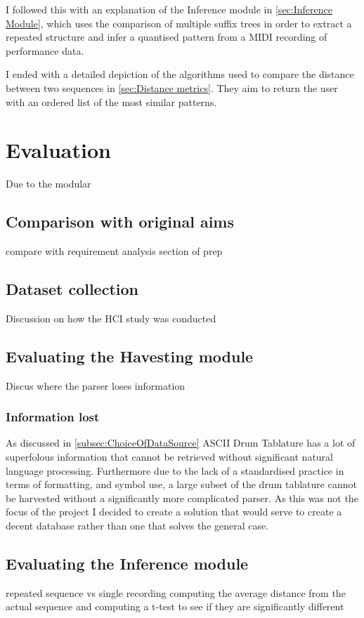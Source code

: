 \documentclass[12pt,twoside,notitlepage]{report}
\begin{document}
	I followed this with an explanation of the Inference module in \ref{sec:Inference Module}, which uses the comparison of multiple suffix trees in order to extract a repeated structure and infer a quantised pattern from a MIDI recording of performance data.
	
	I ended with a detailed depiction of the algorithms used to compare the distance between two sequences in \ref{sec:Distance metrics}. They aim to return the user with an ordered list of the most similar patterns.

\cleardoublepage
\chapter{Evaluation}

	Due to the modular
	\section{Comparison with original aims}
	compare with requirement analysis section of prep
	\section{Dataset collection}
	Discussion on how the HCI study was conducted
	\section{Evaluating the Havesting module}
	Discus where the parser loses information
			\subsection{Information lost}
					As discussed in \ref{subsec:ChoiceOfDataSource} ASCII Drum Tablature has a lot of superfolous information that cannot be retrieved without significant natural language processing. Furthermore due to the lack of a standardised practice in terms of formatting, and symbol use, a large subset of the drum tablature cannot be harvested without a significantly more complicated parser. As this was not the focus of the project I decided to create a solution that would serve to create a decent database rather than one that solves the general case.
	\section{Evaluating the Inference module}\label{sec:Eval Inference module}
		repeated sequence vs single recording computing the average distance from the actual sequence and computing a t-test to see if they are significantly different
\end{document}
